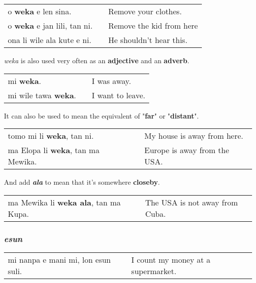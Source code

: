 \begin{supertabular}{p{5,5cm}|ll}
o \textbf{weka} e len sina. && Remove your clothes. \\
o \textbf{weka} e jan lili, tan ni. && Remove the kid from here \\ 
ona li wile ala kute e ni. && He shouldn't hear this. \\ 
\end{supertabular} 

\textit{weka} is also used very often as an \textbf{adjective} and an \textbf{adverb}. 

\begin{supertabular}{p{5,5cm}|ll}
mi \textbf{weka}. && I was away. \\
mi wile tawa \textbf{weka}. && I want to leave. \\
\end{supertabular} 

It can also be used to mean the equivalent of "\textbf{far}" or "\textbf{distant}". 

\begin{supertabular}{p{5,5cm}|ll}
tomo mi li \textbf{weka}, tan ni. && My house is away from here. \\
ma Elopa li \textbf{weka}, tan ma Mewika. && Europe is away from the USA. \\
\end{supertabular} 

And add \textbf{\textit{ala}} to mean that it's somewhere \textbf{closeby}. 

\begin{supertabular}{p{5,5cm}|ll}
ma Mewika li \textbf{weka ala}, tan ma Kupa. && The USA is not away from Cuba. \\
\end{supertabular} 

\subsubsection*{\textit{esun}}

\begin{supertabular}{p{5,5cm}|ll}
mi nanpa e mani mi, lon esun suli. && I count my money at a supermarket. \\
\end{supertabular}
%
